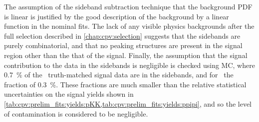 The assumption of the sideband subtraction technique that the background
\ac{PDF} is linear is justified by the good description of the background by a
linear function in the nominal fits.
The lack of any visible physics backgrounds after the full selection described
in \cref{chap:cpv:selection} suggests that the sidebands are purely
combinatorial, and that no peaking structures are present in the signal region
other than the that of the signal.
Finally, the assumption that the signal contribution to the data in the
sidebands is negligible is checked using \ac{MC}, where \SI{0.7}{\percent} of
the \ppipi\ truth-matched signal data are in the sidebands, and for \pKK\ the 
fraction of \SI{0.3}{\percent}.
These fractions are much smaller than the relative statistical uncertainties on
the signal yields shown in
\cref{tab:cpv:prelim_fits:yields:pKK,tab:cpv:prelim_fits:yields:ppipi}, and so
the level of contamination is considered to be negligible.

